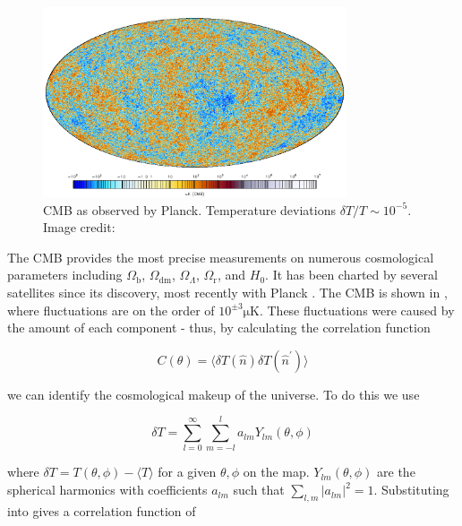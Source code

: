 \begin{figure}
\centering
\includegraphics[width=0.8\textwidth]{PlanckFig_map_columbi1_IDL_HighDR_colbar_1000px_CMB_moll}
\caption{CMB as observed by Planck.  Temperature deviations $\delta T/T \sim 10^{-5}$.  Image credit: \citeref{}}
\label{fig:planck_map}
\end{figure}


The CMB provides the most precise measurements on numerous cosmological parameters including $\Omega_{\mathrm{b}}$,
$\Omega_{\mathrm{dm}}$, $\Omega_{\Lambda}$, $\Omega_{\mathrm{r}}$, and $H_{0}$.  It has been charted by several satellites since
its
discovery, most recently with Planck .  The CMB is shown in ,
where fluctuations are on the order of $10^{\pm 3} \mathrm{\mu K}$.  These fluctuations were caused by the
amount of each component - thus, by calculating the correlation function

\begin{equation}
C(\theta) = \Big \langle \delta T( \hat{n}) \delta T(\hat{n}^\prime) \Big \rangle
\label{eq:cmb_corr_func}
\end{equation}

\noindent we can identify the cosmological makeup of the universe.  To do this we use

\begin{equation}
\delta T = \sum\limits_{l=0}^{\infty} \sum\limits_{m=-l}^{l} a_{lm}Y_{lm}(\theta, \phi)
\label{eq:cmb_delta_t}
\end{equation}

\noindent where $\delta T = T(\theta, \phi) - \langle T \rangle$ for a given $\theta , \phi$
on the map.  $Y_{lm}(\theta, \phi)$ are the spherical harmonics with coefficients $a_{lm}$
such that $\sum\limits_{l,m} |a_{lm}|^{2} = 1$.  Substituting  into  gives a correlation
function of

